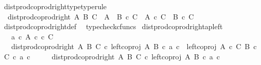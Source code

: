 \begin{isabellebody}
\ dist{\isacharunderscore}{\kern0pt}prod{\isacharunderscore}{\kern0pt}coprod{\isacharunderscore}{\kern0pt}right{\isacharunderscore}{\kern0pt}type{\isacharbrackleft}{\kern0pt}type{\isacharunderscore}{\kern0pt}rule{\isacharbrackright}{\kern0pt}{\isacharcolon}{\kern0pt}\isanewline
\ \ {\isachardoublequoteopen}dist{\isacharunderscore}{\kern0pt}prod{\isacharunderscore}{\kern0pt}coprod{\isacharunderscore}{\kern0pt}right\ A\ B\ C\ {\isacharcolon}{\kern0pt}\ {\isacharparenleft}{\kern0pt}A\ {\isasymCoprod}\ B{\isacharparenright}{\kern0pt}\ {\isasymtimes}\isactrlsub c\ C\ {\isasymrightarrow}\ {\isacharparenleft}{\kern0pt}A\ {\isasymtimes}\isactrlsub c\ C{\isacharparenright}{\kern0pt}\ {\isasymCoprod}\ {\isacharparenleft}{\kern0pt}B\ {\isasymtimes}\isactrlsub c\ C{\isacharparenright}{\kern0pt}{\isachardoublequoteclose}\isanewline
%
\isadelimproof
\ \ %
\endisadelimproof
%
\isatagproof
{}\isamarkupfalse%
\ dist{\isacharunderscore}{\kern0pt}prod{\isacharunderscore}{\kern0pt}coprod{\isacharunderscore}{\kern0pt}right{\isacharunderscore}{\kern0pt}def\ \isamarkupfalse%
\ typecheck{\isacharunderscore}{\kern0pt}cfuncs%
\endisatagproof
{\isafoldproof}%
%
\isadelimproof
\isanewline
%
\endisadelimproof
\isanewline
{}\isamarkupfalse%
\ dist{\isacharunderscore}{\kern0pt}prod{\isacharunderscore}{\kern0pt}coprod{\isacharunderscore}{\kern0pt}right{\isacharunderscore}{\kern0pt}ap{\isacharunderscore}{\kern0pt}left{\isacharcolon}{\kern0pt}\isanewline
\ \ \ {\isachardoublequoteopen}a\ {\isasymin}\isactrlsub c\ A{\isachardoublequoteclose}\ {\isachardoublequoteopen}c\ {\isasymin}\isactrlsub c\ C{\isachardoublequoteclose}\isanewline
\ \ \ {\isachardoublequoteopen}dist{\isacharunderscore}{\kern0pt}prod{\isacharunderscore}{\kern0pt}coprod{\isacharunderscore}{\kern0pt}right\ A\ B\ C\ {\isasymcirc}\isactrlsub c\ {\isasymlangle}left{\isacharunderscore}{\kern0pt}coproj\ A\ B\ {\isasymcirc}\isactrlsub c\ a{\isacharcomma}{\kern0pt}\ c{\isasymrangle}\ {\isacharequal}{\kern0pt}\ left{\isacharunderscore}{\kern0pt}coproj\ {\isacharparenleft}{\kern0pt}A\ {\isasymtimes}\isactrlsub c\ C{\isacharparenright}{\kern0pt}\ {\isacharparenleft}{\kern0pt}B\ {\isasymtimes}\isactrlsub c\ C{\isacharparenright}{\kern0pt}\ {\isasymcirc}\isactrlsub c\ {\isasymlangle}a{\isacharcomma}{\kern0pt}\ c{\isasymrangle}{\isachardoublequoteclose}\isanewline
%
\isadelimproof
%
\endisadelimproof
%
\isatagproof
{}\isamarkupfalse%
\ {\isacharminus}{\kern0pt}\isanewline
\ \ \isamarkupfalse%
\ {\isachardoublequoteopen}dist{\isacharunderscore}{\kern0pt}prod{\isacharunderscore}{\kern0pt}coprod{\isacharunderscore}{\kern0pt}right\ A\ B\ C\ {\isasymcirc}\isactrlsub c\ {\isasymlangle}left{\isacharunderscore}{\kern0pt}coproj\ A\ B\ {\isasymcirc}\isactrlsub c\ a{\isacharcomma}{\kern0pt}\ c{\isasymrangle}\isanewline

\end{isabellebody}
